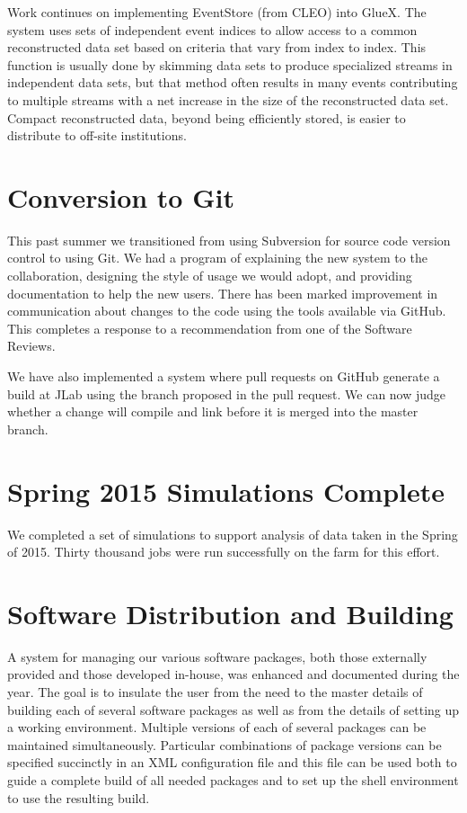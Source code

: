 \documentclass[12pt]{article}
\begin{document}
Work continues on implementing EventStore (from CLEO) into GlueX.
The system uses sets of independent event indices to
allow access to a common reconstructed data set based on criteria that
vary from index to index. This function is usually done by skimming
data sets to produce specialized streams in independent data sets, but
that method often results in many events contributing to multiple
streams with a net increase in the size of the reconstructed data
set. Compact reconstructed data, beyond being efficiently stored, is
easier to distribute to off-site institutions.

\section{Conversion to Git}

This past summer we transitioned from using Subversion for source code
version control to using Git. We had a program of explaining the new
system to the collaboration, designing the style of usage we would
adopt, and providing documentation to help the new users. There has
been marked improvement in communication about changes to the code
using the tools available via GitHub\cite{gluex-github}.
This completes a response to a
recommendation from one of the Software Reviews.

We have also implemented a system where pull requests on GitHub generate a build
at JLab using the branch proposed in the pull request. We can now
judge whether a change will compile and link before it is merged into
the master branch.

\section{Spring 2015 Simulations Complete}

We completed a set of simulations to support analysis of data taken in
the Spring of 2015. Thirty thousand jobs were run successfully on the
farm for this effort.

\section{Software Distribution and Building}

A system for managing our various software packages,
both those externally provided
and those developed in-house, was enhanced and documented during the
year. The goal is to insulate the user from the need to the master
details of building each of several software packages as well as from
the details of setting up a working environment. Multiple versions of
each of several packages can be maintained simultaneously. Particular
combinations of package versions can be specified succinctly in an XML
configuration file and this file can be used both to guide a complete
build of all needed packages and to set up the shell environment to
use the resulting build.
\end{document}
